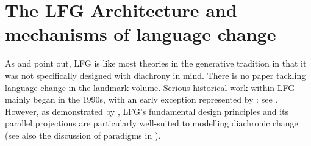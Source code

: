 \documentclass[output=paper,hidelinks]{langscibook}
\begin{document}
\section{The LFG Architecture and mechanisms of language change}
\label{sec:Historical:archi}


\largerpage[-1]
As \citet{vincent2001lfg} and \citet{borjars2017lexical} point out, LFG is like most theories in the generative tradition in that it was not specifically designed with diachrony in mind. There is no paper tackling language change in the landmark \citet{bresnan82} volume.  Serious historical work within LFG mainly began in the 1990s, with an early exception represented by \citet{allen1986}: see .   However, as demonstrated by \citet{vincent2001lfg}, LFG's fundamental design principles and its parallel projections
are particularly well-suited to modelling diachronic change (see also the discussion of paradigms in \citealt{borjars1997paradigms}).  
\end{document}
